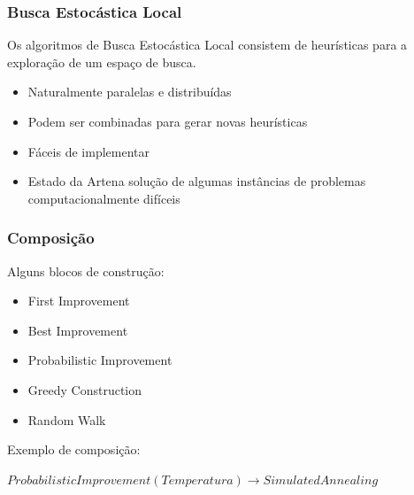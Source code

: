 \documentclass[10pt, compress]{beamer}
\begin{document}
\begin{frame}[fragile]
\begin{columns}
\begin{figure}[h]
        \end{figure}
    \end{columns}
    \let\thefootnote\relax{}
\end{frame}

\begin{frame}[fragile]
    \frametitle{Busca Estocástica Local}
    Os algoritmos de Busca Estocástica Local consistem de
    \alert{heurísticas} para a exploração de um espaço de busca.
    \pause
    \begin{itemize}
        \item Naturalmente \alert{paralelas} e \alert{distribuídas}
        \item Podem ser \alert{combinadas} para gerar novas heurísticas
            \pause
        \item \alert{Fáceis} de implementar
            \pause
        \item \alert{Estado da Arte}\footnotemark[1]\footnotemark[2] na solução
            de \alert{algumas instâncias} de problemas computacionalmente
            difíceis
    \end{itemize}
\end{frame}

\begin{frame}[fragile]
    \frametitle{Composição}
    Alguns \alert{blocos de construção}:
    \begin{itemize}
        \item First Improvement
        \item Best Improvement
        \item Probabilistic Improvement
        \item Greedy Construction
        \item Random Walk
    \end{itemize}
            \pause
    Exemplo de \alert{composição}:

    $ProbabilisticImprovement(Temperatura) \rightarrow SimulatedAnnealing$
\end{frame}
\end{document}
